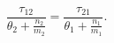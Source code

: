 \begin{equation} \label{holcondt4}
\frac{\tau_{12}}{ \theta_2 + \frac{n_2}{m_2}} = \frac{\tau_{21}}
{\theta_1 + \frac{n_1}{m_1}}  .
\end{equation}

